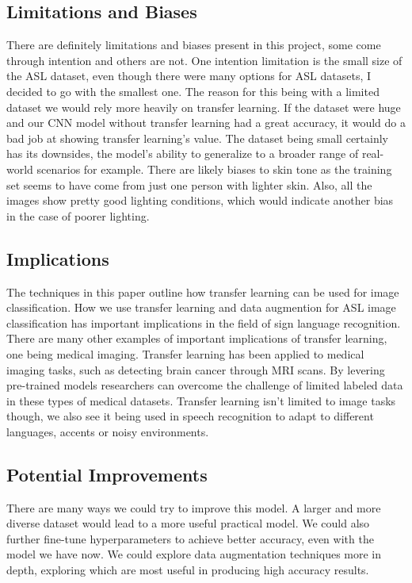 \documentclass[12pt]{article}
\begin{document}
\subsection{Limitations and Biases}
There are definitely limitations and biases present in this project, some come through intention and others are not. One intention limitation is the small size of the ASL dataset,
even though there were many options for ASL datasets, I decided to go with the smallest one. The reason for this being with a limited dataset we would rely more heavily on transfer learning.
If the dataset were huge and our CNN model without transfer learning had a great accuracy, it would do a bad job at showing transfer learning's value. The dataset being small certainly has its downsides,
the model's ability to generalize to a broader range of real-world scenarios for example. There are likely biases to skin tone as the training set seems to have come from just one person with lighter skin.
Also, all the images show pretty good lighting conditions, which would indicate another bias in the case of poorer lighting.

\subsection{Implications}
The techniques in this paper outline how transfer learning can be used for image classification. How we use transfer learning and data augmention for ASL image classification has important implications in the field of sign language recognition.
There are many other examples of important implications of transfer learning, one being
medical imaging. Transfer learning has been applied to medical imaging tasks, such as detecting brain cancer through MRI scans. By levering pre-trained models researchers can overcome the challenge of limited labeled data in these
types of medical datasets. Transfer learning isn't limited to image tasks though, we also see it being used in speech recognition to adapt to different languages, accents or noisy environments.

\subsection{Potential Improvements}
There are many ways we could try to improve this model. A larger and more diverse dataset would lead to a more useful practical model. We could also further fine-tune hyperparameters to achieve better accuracy, even with the model we have now.
We could explore data augmentation techniques more in depth, exploring which are most useful in producing high accuracy results.
\end{document}
